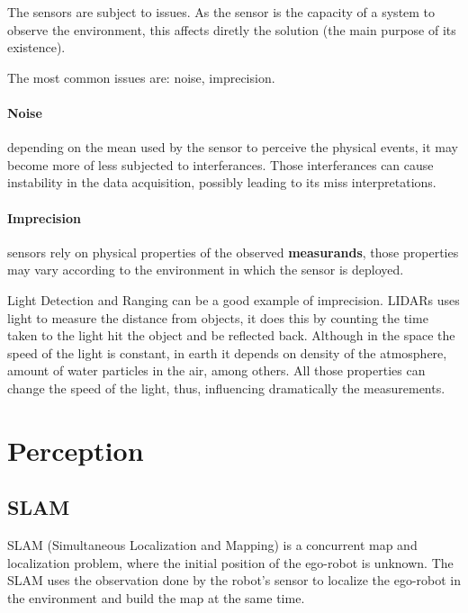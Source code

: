 The sensors are subject to issues. As the sensor is the capacity of a system to observe the environment, this affects diretly the solution (the main purpose of its existence).

The most common issues are: noise, imprecision. 

\paragraph{Noise} depending on the mean used by the sensor to perceive the physical events, it may become more of less subjected to interferances. Those interferances can cause instability in the data acquisition, possibly leading to its miss interpretations.

\paragraph{Imprecision} sensors rely on physical properties of the observed \textbf{measurands}, those properties may vary according to the environment in which the sensor is deployed.

Light Detection and Ranging can be a good example of imprecision. LIDARs uses light to measure the distance from objects, it does this by counting the time taken to the light hit the object and be reflected back. Although in the space the speed of the light is constant, in earth it depends on density of the atmosphere, amount of water particles in the air, among others. All those properties can change the speed of the light, thus, influencing dramatically the measurements.


\section{Perception}

\subsection{SLAM}

SLAM (Simultaneous Localization and Mapping) is a concurrent map and localization problem, where the initial position of the ego-robot is unknown. The SLAM uses the observation done by the robot's sensor to localize the ego-robot in the environment and build the map at the same time\cite{VU-2009-454238}. 

